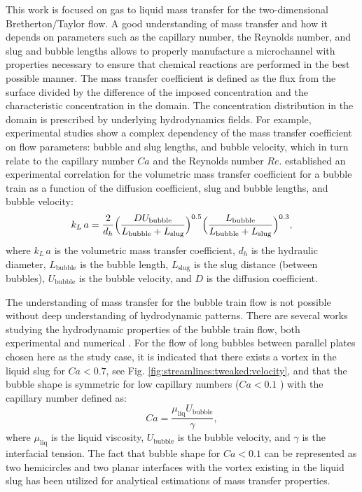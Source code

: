 \documentclass{article}
\newcommand{\beq}{\begin{equation}}
\newcommand{\feq}{\end{equation}}
\newcommand{\vol}{k_L\,a}
\newcommand{\lbubble}{L_{\mathrm{bubble}}}
\newcommand{\lslug}{L_{\mathrm{slug}}}
\newcommand{\ububble}{U_{\mathrm{bubble}}}
\begin{document}
This work is focused on  gas to liquid mass transfer  for the two-dimensional Bretherton/Taylor flow. A good understanding of mass transfer and how it depends on 
parameters such as the capillary number, the Reynolds number, and slug and bubble lengths allows to properly
manufacture a microchannel with properties necessary to ensure that chemical
reactions are performed in the best possible manner. The mass transfer coefficient is defined as the flux from the 
surface divided by the difference of the imposed concentration and the characteristic concentration in the domain.
 The  concentration distribution in the domain is prescribed by underlying hydrodynamics fields. 
 For example, experimental studies \cite{yue-mass,bercic-mass} show a complex dependency of the mass transfer coefficient on flow parameters:
 bubble and slug lengths, and bubble velocity, which  in turn relate to the capillary number $Ca$ and the Reynolds number $Re$. 
\citet{yue-mass} established an experimental correlation for the volumetric mass transfer coefficient for a bubble train as
a function of the diffusion coefficient, slug and bubble lengths, and bubble velocity: 
\begin{equation}
\vol =\frac{2}{d_h} \Bigl(\frac{D
\ububble}{\lbubble+\lslug}\Bigr)^{0.5}
\Bigl(\frac{\lbubble}{\lbubble+\lslug}\Bigr)^{0.3},
\end{equation}
where $\vol$ is the volumetric mass transfer coefficient, $d_h$ is the hydraulic
diameter, $\lbubble$ is the bubble length, $\lslug$ is the slug distance (between bubbles),
$\ububble$ is the bubble velocity, and $D$ is the diffusion coefficient. 

The understanding of mass transfer for the bubble train flow is not possible without deep understanding of hydrodynamic patterns.
There are several works studying the hydrodynamic properties of the bubble train flow, both
experimental \cite{kreutzer-pressure-drop,cerro-space,cerro-bubble-train} and numerical \cite{wang-non-circular,kuzmin-binary3d,giavedoni-numerical,heil-threedim}.
 For the flow of long bubbles between parallel plates chosen here as the study case, it is indicated that  there exists a vortex 
in the liquid slug for $Ca<0.7$, see Fig. \ref{fig:streamlines:tweaked:velocity}, and that the bubble shape is symmetric for low capillary 
numbers ($Ca<0.1$ \cite{cerro-bubble-train}) with the capillary number defined as:
 \beq
 Ca=\frac{\mu_{\mathrm{liq}} \ububble}{\gamma},
 \feq
 where $\mu_{\mathrm{liq}}$ is the liquid viscosity, $\ububble$ is the bubble velocity, and $\gamma$ is the interfacial tension.
 The fact that bubble shape for $Ca<0.1$ can be represented as two hemicircles and two planar interfaces with the vortex existing in the liquid slug has been 
utilized for analytical estimations of mass transfer properties.
\end{document}
